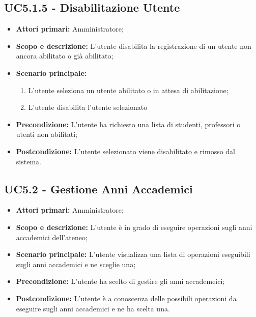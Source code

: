 \documentclass[AnalisiDeiRequisiti.tex]{subfiles}
\begin{document}
\subsection{UC5.1.5 - Disabilitazione Utente}
\begin{itemize}
	\item \textbf{Attori primari:} Amministratore;
	\item \textbf{Scopo e descrizione:} L'utente disabilita la registrazione di un utente non ancora abilitato o già abilitato;
	\item \textbf{Scenario principale:}
	\begin{enumerate}
		\item L'utente seleziona un utente abilitato o in attesa di abilitazione;
		\item L'utente disabilita l'utente selezionato
	\end{enumerate}
	\item \textbf{Precondizione:} L'utente ha richiesto una lista di studenti, professori o utenti non abilitati; 
	\item \textbf{Postcondizione:} L'utente selezionato viene disabilitato e rimosso dal sistema.
\end{itemize}
\subsection{UC5.2 - Gestione Anni Accademici}
\begin{itemize}
	\item \textbf{Attori primari:} Amministratore;
	\item \textbf{Scopo e descrizione:} L'utente è in grado di eseguire operazioni sugli anni accademici dell'ateneo;
	\item \textbf{Scenario principale:} L'utente visualizza una lista di operazioni eseguibili sugli anni accademici e ne sceglie una;
	\item \textbf{Precondizione:} L'utente ha scelto di gestire gli anni accademeici; 
	\item \textbf{Postcondizione:} L'utente è a conoscenza delle possibili operazioni da eseguire sugli anni accademici e ne ha scelta una.
\end{itemize}
\end{document}

